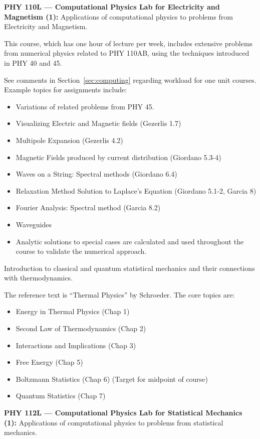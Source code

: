 \documentclass[12pt]{article}
\begin{document}
\vskip 1cm
\noindent
{\bf PHY 110L --- Computational Physics Lab for Electricity and Magnetism (1):}
Applications of computational physics to problems from Electricity and
Magnetism.

This course, which has one hour of lecture per week, includes
extensive problems from numerical physics related to PHY 110AB, using
the techniques introduced in PHY 40 and 45.

See comments in Section~\ref{sec:computing} regarding workload for one
unit courses.  Example topics for assignments include:
\begin{itemize}
\item Variations of related problems from PHY 45.
\item Visualizing Electric and Magnetic fields (Gezerlis 1.7)
\item Multipole Expansion (Gezerlis 4.2)
\item Magnetic Fields produced by current distribution (Giordano 5.3-4)
\item Waves on a String: Spectral methods (Giordano 6.4)
\item Relaxation Method Solution to Laplace's Equation (Giordano 5.1-2, Garcia 8)
\item Fourier Analysis:  Spectral method (Garcia 8.2)
\item Waveguides
\item Analytic solutions to special cases are calculated and used throughout the
  course to validate the numerical approach.
\end{itemize}

\vskip 1cm
Introduction to classical and quantum statistical mechanics and their connections with thermodynamics.

The reference text is ``Thermal Physics'' by Schroeder.  The core topics are:
\begin{itemize}
\item Energy in Thermal Physics (Chap 1)
\item Second Law of Thermodynamics (Chap 2)
\item Interactions and Implications (Chap 3)
\item Free Energy (Chap 5)
\item Boltzmann Statistics (Chap 6) (Target for midpoint of course)
\item Quantum Statistics (Chap 7) 
\end{itemize}

\vskip 1cm
\noindent
{\bf PHY 112L --- Computational Physics Lab for Statistical Mechanics (1):}
Applications of computational physics to problems from statistical mechanics.
\end{document}
